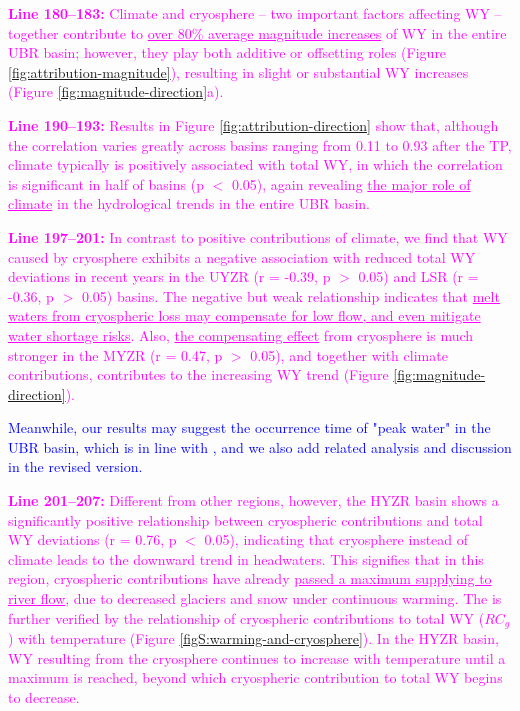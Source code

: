 \documentclass[11pt]{article}
\newcommand{\nextreply}[1]{\bigskip \textcolor{blue}{\noindent #1}}
\newcommand{\revised}[3][2]{\bigskip \textcolor{magenta}{\noindent \textbf{Line #2:} #3}}
\begin{document}
\revised{180--183}{Climate and cryosphere -- two important factors affecting WY -- together contribute to \ul{over 80\% average magnitude increases} of WY in the entire UBR basin; however, they play both additive or offsetting roles (Figure \ref{fig:attribution-magnitude}), resulting in slight or substantial WY increases (Figure \ref{fig:magnitude-direction}a).}

\revised{190--193}{Results in Figure \ref{fig:attribution-direction} show that, although the correlation varies greatly across basins ranging from 0.11 to 0.93 after the TP, climate typically is positively associated with total WY, in which the correlation is significant in half of basins (p $<$ 0.05), again revealing \ul{the major role of climate} in the hydrological trends in the entire UBR basin.}

\revised{197--201}{In contrast to positive contributions of climate, we find that WY caused by cryosphere exhibits a negative association with reduced total WY deviations in recent years in the UYZR (r = -0.39, p $>$ 0.05) and LSR (r = -0.36, p $>$ 0.05) basins. 
The negative but weak relationship indicates that \ul{melt waters from cryospheric loss may compensate for low flow, and even mitigate water shortage risks}. 
Also, \ul{the compensating effect} from cryosphere is much stronger in the MYZR (r = 0.47, p $>$ 0.05), and together with climate contributions, contributes to the increasing WY trend (Figure \ref{fig:magnitude-direction}).}

\nextreply{Meanwhile, our results may suggest the occurrence time of "peak water" in the UBR basin, which is in line with \citet{huss2018global}, and we also add related analysis and discussion in the revised version.}

\revised{201--207}{Different from other regions, however, the HYZR basin shows a significantly positive relationship between cryospheric contributions and total WY deviations (r = 0.76, p $<$ 0.05), indicating that cryosphere instead of climate leads to the downward trend in headwaters.
This signifies that in this region, cryospheric contributions have already \ul{passed a maximum supplying to river flow}, due to decreased glaciers and snow under continuous warming.
The is further verified by the relationship of cryospheric contributions to total WY ($RC_g$) with temperature (Figure \ref{figS:warming-and-cryosphere}). 
In the HYZR basin, WY resulting from the cryosphere continues to increase with temperature until a maximum is reached, beyond which cryospheric contribution to total WY begins to decrease.}
\end{document}
